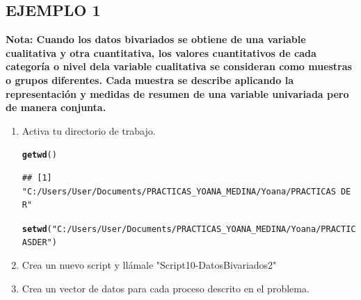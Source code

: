 \documentclass[12pt,letterpaper]{article}\usepackage[]{graphicx}\usepackage[]{color}
\makeatletter
\newcommand{\hlstr}[1]{\textcolor[rgb]{0.192,0.494,0.8}{#1}}%
\newcommand{\hlstd}[1]{\textcolor[rgb]{0.345,0.345,0.345}{#1}}%
\newcommand{\hlkwd}[1]{\textcolor[rgb]{0.737,0.353,0.396}{\textbf{#1}}}%
\newenvironment{kframe}{%
 \def\at@end@of@kframe{}%
 \ifinner\ifhmode%
  \def\at@end@of@kframe{\end{minipage}}%
  \begin{minipage}{\columnwidth}%
 \fi\fi%
 \def\FrameCommand##1{\hskip\@totalleftmargin \hskip-\fboxsep
 \colorbox{shadecolor}{##1}\hskip-\fboxsep
     \hskip-\linewidth \hskip-\@totalleftmargin \hskip\columnwidth}%
 \MakeFramed {\advance\hsize-\width
   \@totalleftmargin\z@ \linewidth\hsize
   \@setminipage}}%
 {\par\unskip\endMakeFramed%
 \at@end@of@kframe}
\newenvironment{knitrout}{}{} %
\makeatother
\begin{document}
\subsection*{EJEMPLO 1}

\textbf{Nota: Cuando los datos bivariados se obtiene de una variable cualitativa y otra cuantitativa, los valores cuantitativos de cada categor\'ia o nivel dela variable cualitativa se consideran como muestras o grupos diferentes. Cada muestra se describe aplicando la representaci\'on y medidas de resumen de una variable univariada pero de manera conjunta.}\\

\begin{enumerate}
\item Activa tu directorio de trabajo.

\begin{knitrout}
\color{fgcolor}\begin{kframe}
\begin{alltt}
\hlkwd{getwd}\hlstd{()}
\end{alltt}
\begin{verbatim}
## [1] "C:/Users/User/Documents/PRACTICAS_YOANA_MEDINA/Yoana/PRACTICAS DE R"
\end{verbatim}
\begin{alltt}
\hlkwd{setwd}\hlstd{(}\hlstr{"C:/Users/User/Documents/PRACTICAS_YOANA_MEDINA/Yoana/PRACTICAS DE R"}\hlstd{)}
\end{alltt}
\end{kframe}
\end{knitrout}

\item Crea un nuevo script y ll\'amale "Script10-DatosBivariados2"

\item Crea un vector de datos para cada proceso descrito en el problema.


\end{enumerate}
\end{document}
